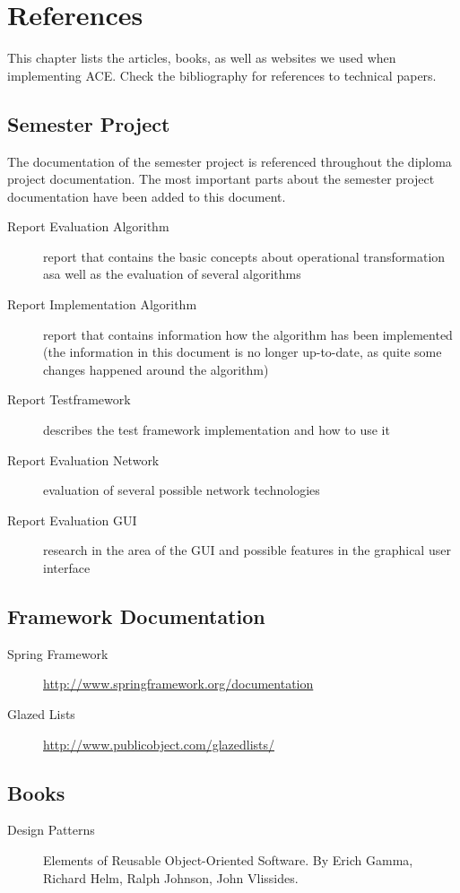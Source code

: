 \chapter{References}
\label{chapter:references}

This chapter lists the articles, books, as well as websites we used when
implementing ACE. Check the bibliography for references to technical
papers.


\section{Semester Project}
The documentation of the semester project is referenced throughout the
diploma project documentation. The most important parts about the 
semester project documentation have been added to this document.

\begin{description}
 \item[Report Evaluation Algorithm] report that contains the basic concepts about operational transformation asa well as the evaluation of several algorithms
 \item[Report Implementation Algorithm] report that contains information how the algorithm has been implemented (the information in this document is no longer up-to-date, as quite some changes happened around the algorithm)
 \item[Report Testframework] describes the test framework implementation and how to use it
 \item[Report Evaluation Network] evaluation of several possible network technologies
 \item[Report Evaluation GUI] research in the area of the GUI and possible features in the graphical user interface
\end{description}



\section{Framework Documentation}

\begin{description}
 \item[Spring Framework] \href{http://www.springframework.org/documentation}{http://www.springframework.org/documentation}
 \item[Glazed Lists] \href{http://www.publicobject.com/glazedlists/}{http://www.publicobject.com/glazedlists/}
\end{description}

\section{Books}
\begin{description}
 \item[Design Patterns] Elements of Reusable Object-Oriented Software. By Erich Gamma, Richard Helm, Ralph Johnson, John Vlissides.
\end{description}